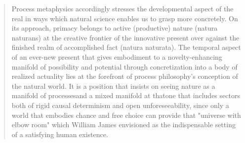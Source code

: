 \documentclass[a4paper]{Thesis}
\begin{document}
	\begin{quotation}
		Process metaphysics accordingly stresses the developmental aspect of the real in ways
		which natural science enables us to grasp more concretely. On its approach, primacy
		belongs to active (productive) nature (natura naturans) at the creative frontier of the
		innovative present over against the finished realm of accomplished fact (natura
		naturata). The temporal aspect of an ever-new present that gives embodiment to a
		novelty-enhancing manifold of possibility and potential through concretization into a body
		of realized actuality lies at the forefront of process philosophy's conception of the natural
		world.
		It is a position that insists on seeing
		nature as a manifold of processesand a mixed manifold at thatone that includes sectors
		both of rigid causal determinism and open unforeseeability, since only a world that
		embodies chance and free choice can provide that "universe with elbow room" which
		William James envisioned as the indispensable setting of a satisfying human existence.
		
	\end{quotation}
	
\end{document}
